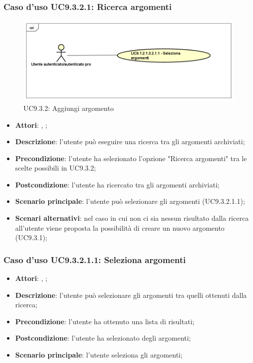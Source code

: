 		 \subsubsection{Caso d'uso UC9.3.2.1: Ricerca argomenti}
		 \label{UC9.3.2.1}
		 \begin{figure}[h]
		 	\centering
		 	\includegraphics[scale=0.5,keepaspectratio]{UML/UC9_1_2_1_3_2_1.png}
		 	\caption{UC9.3.2: Aggiungi argomento}
		 \end{figure}
		 \FloatBarrier
		 \begin{itemize}
		 	\item \textbf{Attori}: \uau, \uaupro;
		 	\item \textbf{Descrizione}: l'utente può eseguire una ricerca tra gli argomenti archiviati; 
		 	\item \textbf{Precondizione}: l'utente ha selezionato l'opzione "Ricerca argomenti" tra le scelte possibili in UC9.3.2;
		 	\item \textbf{Postcondizione}: l'utente ha ricercato tra gli argomenti archiviati;
		 	\item \textbf{Scenario principale}: l'utente può selezionare gli argomenti (UC9.3.2.1.1); 
		 	\item \textbf{Scenari alternativi}: nel caso in cui non ci sia nessun risultato dalla ricerca all'utente viene proposta la possibilità di creare un nuovo argomento (UC9.3.1);
		 \end{itemize}
		 
		 \subsubsection{Caso d'uso UC9.3.2.1.1: Seleziona argomenti}
		 \label{UC9.3.2.2}
		 \begin{itemize}
		 	\item \textbf{Attori}: \uau, \uaupro;
		 	\item \textbf{Descrizione}: l'utente può selezionare gli argomenti tra quelli ottenuti dalla ricerca;
		 	\item \textbf{Precondizione}: l'utente ha ottenuto una lista di risultati;
		 	\item \textbf{Postcondizione}: l'utente ha selezionato degli argomenti; 
		 	\item \textbf{Scenario principale}: l'utente seleziona gli argomenti;
		 \end{itemize}
		 
